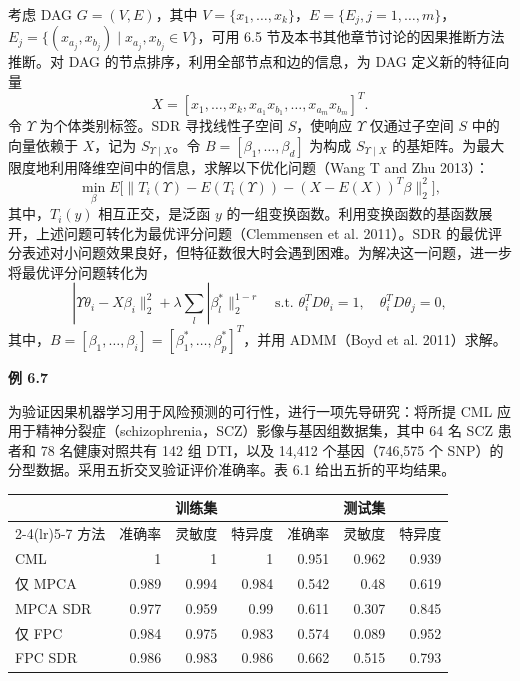 考虑 DAG $G=(V,E)$，其中 $V=\{x_1,\ldots,x_k\}$，$E=\{E_j,j=1,\ldots,m\}$，$E_j=\{(x_{a_j},x_{b_j})\mid x_{a_j},x_{b_j}\in V\}$，可用 6.5 节及本书其他章节讨论的因果推断方法推断。对 DAG 的节点排序，利用全部节点和边的信息，为 DAG 定义新的特征向量
\[
X=[x_1,\ldots,x_k,x_{a_1}x_{b_1},\ldots,x_{a_m}x_{b_m}]^T.
\]
令 $\Upsilon$ 为个体类别标签。SDR 寻找线性子空间 $S$，使响应 $\Upsilon$ 仅通过子空间 $S$ 中的向量依赖于 $X$，记为 $S_{\Upsilon\mid X}$。令 $B=[\beta_1,\ldots,\beta_d]$ 为构成 $S_{\Upsilon\mid X}$ 的基矩阵。为最大限度地利用降维空间中的信息，求解以下优化问题（Wang T and Zhu 2013）：
\begin{equation}
\min_\beta E\bigl[\lVert T_i(\Upsilon)-E(T_i(\Upsilon))-(X-E(X))^T\beta\rVert_2^2\bigr],
\tag{6.242}
\end{equation}
其中，$T_i(y)$ 相互正交，是泛函 $y$ 的一组变换函数。利用变换函数的基函数展开，上述问题可转化为最优评分问题（Clemmensen et al. 2011）。SDR 的最优评分表述对小问题效果良好，但特征数很大时会遇到困难。为解决这一问题，进一步将最优评分问题转化为
\begin{equation}
|\Upsilon\theta_i-X\beta_i\rVert_2^2+\lambda\sum_l|\beta_l^*\rVert_2^{1-r}
\quad\text{s.t. }\theta_i^TD\theta_i=1,\quad\theta_i^TD\theta_j=0,
\tag{6.243}
\end{equation}
其中，$B=[\beta_1,\ldots,\beta_i]=[\beta_1^*,\ldots,\beta_p^*]^T$，并用 ADMM（Boyd et al. 2011）求解。

\noindent\textbf{例 6.7}

为验证因果机器学习用于风险预测的可行性，进行一项先导研究：将所提 CML 应用于精神分裂症（schizophrenia，SCZ）影像与基因组数据集，其中 64 名 SCZ 患者和 78 名健康对照共有 142 组 DTI，以及 14,412 个基因（746,575 个 SNP）的分型数据。采用五折交叉验证评价准确率。表 6.1 给出五折的平均结果。
\begin{table}[htbp]
\centering
{}
\small\setlength{\tabcolsep}{5pt}
\begin{tabular}{lrrrrrr}
\toprule
&\multicolumn{3}{c}{训练集}&\multicolumn{3}{c}{测试集}\\
\cmidrule(lr){2-4}\cmidrule(lr){5-7}
方法&准确率&灵敏度&特异度&准确率&灵敏度&特异度\\
\midrule
CML&1&1&1&0.951&0.962&0.939\\
仅 MPCA&0.989&0.994&0.984&0.542&0.48&0.619\\
MPCA SDR&0.977&0.959&0.99&0.611&0.307&0.845\\
仅 FPC&0.984&0.975&0.983&0.574&0.089&0.952\\
FPC SDR&0.986&0.983&0.986&0.662&0.515&0.793\\
\bottomrule
\end{tabular}
\end{table}


